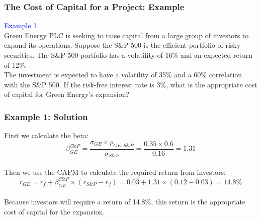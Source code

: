 \documentclass[9pt,aspectratio=169]{beamer}
\begin{document}

\begin{frame}

\frametitle{\textnormal{The Cost of Capital for a Project: Example}}

\textcolor{blue}{Example 1}
\\
\vspace{6pt}
Green Energy PLC is seeking to raise capital from a large group of investors to expand its operations. Suppose the S\&P 500 is the efficient portfolio of risky securities. The S\&P 500 portfolio has a volatility of 16\% and an expected return of 12\%. 
\\
\vspace{6pt}
The investment is expected to have a volatility of 35\% and a 60\% correlation with the S\&P 500. If the risk-free interest rate is 3\%, what is the appropriate cost of capital for Green Energy’s expansion?

    
   

\end{frame}



\begin{frame}
\frametitle{\textnormal{Example 1: Solution}}

First we calculate the beta: 
\\
$$\beta_{GE}^{S\&P} = \frac{\sigma_{GE}  \times \rho_{GE,S\&P}}{\sigma_{S\&P}} = \frac{0.35 \times 0.6 }{0.16} = 1.31$$
\\
Then we use the CAPM to calculate the required return from investors: 
$$r_{GE} = r_f + \beta_{GE}^{S\&P} \times  (r_{S\&P} - r_f) = 0.03+1.31 \times (0.12-0.03)=14.8\% $$
\\
Because investors will require a return of 14.8\%, this return is the appropriate cost of capital for the expansion. 

\end{frame}

\end{document}
